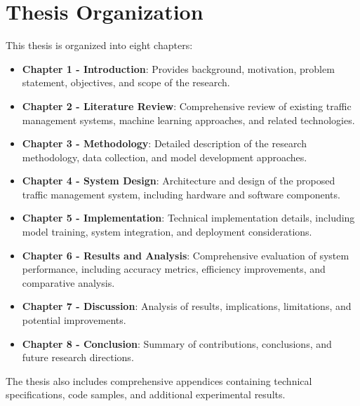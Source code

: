 \section{Thesis Organization}

This thesis is organized into eight chapters:

\begin{itemize}
    \item \textbf{Chapter 1 - Introduction}: Provides background, motivation, problem statement, objectives, and scope of the research.
    
    \item \textbf{Chapter 2 - Literature Review}: Comprehensive review of existing traffic management systems, machine learning approaches, and related technologies.
    
    \item \textbf{Chapter 3 - Methodology}: Detailed description of the research methodology, data collection, and model development approaches.
    
    \item \textbf{Chapter 4 - System Design}: Architecture and design of the proposed traffic management system, including hardware and software components.
    
    \item \textbf{Chapter 5 - Implementation}: Technical implementation details, including model training, system integration, and deployment considerations.
    
    \item \textbf{Chapter 6 - Results and Analysis}: Comprehensive evaluation of system performance, including accuracy metrics, efficiency improvements, and comparative analysis.
    
    \item \textbf{Chapter 7 - Discussion}: Analysis of results, implications, limitations, and potential improvements.
    
    \item \textbf{Chapter 8 - Conclusion}: Summary of contributions, conclusions, and future research directions.
\end{itemize}

The thesis also includes comprehensive appendices containing technical specifications, code samples, and additional experimental results. 